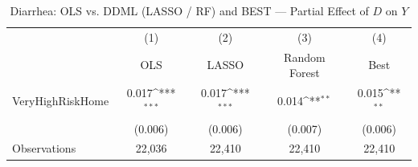 \begin{table}[htbp]\centering
\def\sym#1{\ifmmode^{#1}\else\(^{#1}\)\fi}
\caption{Diarrhea: OLS vs. DDML (LASSO / RF) and BEST — Partial Effect of $D$ on $Y$}
\begin{tabular}{l*{4}{c}}
\toprule
                &\multicolumn{1}{c}{(1)}&\multicolumn{1}{c}{(2)}&\multicolumn{1}{c}{(3)}&\multicolumn{1}{c}{(4)}\\
                &\multicolumn{1}{c}{OLS}&\multicolumn{1}{c}{LASSO}&\multicolumn{1}{c}{Random Forest}&\multicolumn{1}{c}{Best}\\
\midrule
VeryHighRiskHome&    0.017\sym{***}&    0.017\sym{***}&    0.014\sym{**} &    0.015\sym{**} \\
                &  (0.006)         &  (0.006)         &  (0.007)         &  (0.006)         \\
\midrule
Observations    &   22,036         &   22,410         &   22,410         &   22,410         \\
\bottomrule
\end{tabular}
\end{table}
